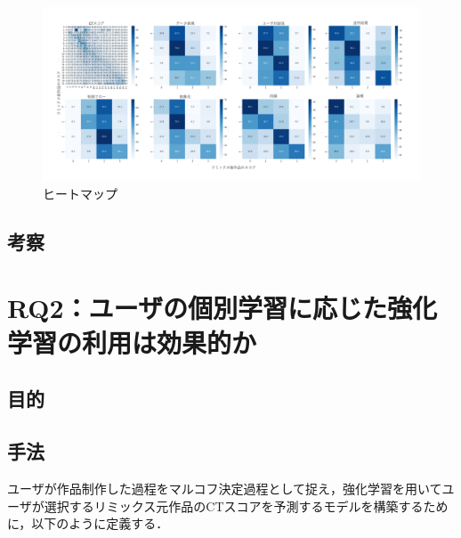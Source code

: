 \documentclass[submit,techrep,noauthor]{ipsj}
\begin{document}
\begin{figure}[t]
  \centering
  \includegraphics[width=\textwidth]{@IPSJ_SIGSE202511_Horio/heatmap.pdf}
  \caption{ヒートマップ}
  \label{heatmap}
\end{figure}

\subsection{考察}



\section{RQ2：ユーザの個別学習に応じた強化学習の利用は効果的か}
\subsection{目的}

\subsection{手法}
ユーザが作品制作した過程をマルコフ決定過程として捉え，強化学習を用いてユーザが選択するリミックス元作品のCTスコアを予測するモデルを構築するために，以下のように定義する．
\end{document}
